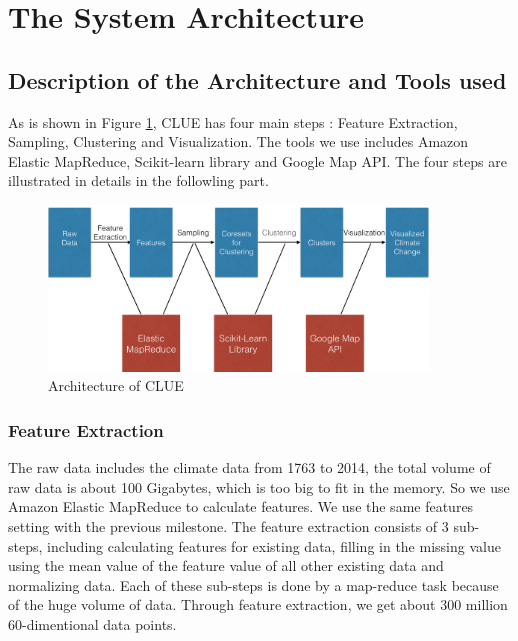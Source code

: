 \section{The System Architecture}

\subsection{Description of the Architecture and Tools used}
As is shown in Figure \ref{fig:archi}, CLUE has four main steps : Feature Extraction, Sampling, Clustering and Visualization. The tools we use includes Amazon Elastic MapReduce\cite{EMR}, Scikit-learn\cite{sklearn} library and Google Map API\cite{GoogleMap}. The four steps are illustrated in details in the followling part.
\begin{figure}[htbp]
				\centering
				\includegraphics[width=0.9\textwidth]{images/Architecture.png}
				\caption{Architecture of CLUE}
				\label{fig:archi}
 \end{figure}
 
\subsubsection{Feature Extraction}
The raw data includes the climate data from 1763 to 2014, the total volume of raw data is about 100 Gigabytes, which is too big to fit in the memory. So we use Amazon Elastic MapReduce to calculate features. We use the same features setting with the previous milestone. The feature extraction consists of 3 sub-steps, including calculating features for existing data, filling in the missing value using the mean value of the feature value of all other existing data and normalizing data. Each of these sub-steps is done by a map-reduce task because of the huge volume of data. Through feature extraction, we get about 300 million 60-dimentional data points.

